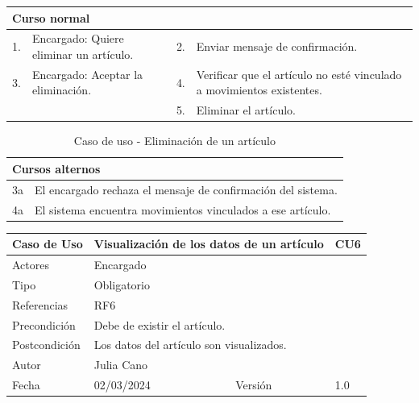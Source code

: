 \begin{table}[H]
	\centering
	\begin{tabular}{| m{} | m{} | m{} | m{} |}
		\hline
		\multicolumn{4}{|m{0.9\textwidth}|}{Curso normal}     \\ 
		\hline
		1. & Encargado: Quiere eliminar un artículo. & 2. &  Enviar mensaje de confirmación.  \\ 
		\hline
		3. & Encargado: Aceptar la eliminación. & 4. & Verificar que el artículo no esté vinculado a movimientos existentes. \\ 
		\hline
		 & & 5. & Eliminar el artículo. \\ 
		\hline
	\end{tabular}
\end{table}

\begin{table}[H]
	\centering
	\begin{tabular}{| m{} | m{} | m{} | m{} |}
		\hline
		\multicolumn{4}{|m{0.9\textwidth}|}{Cursos alternos}     \\ 
		\hline
		3a & \multicolumn{3}{m{0.67\textwidth}|}{El encargado rechaza el mensaje de confirmación del sistema.} \\ 
		\hline
		4a & \multicolumn{3}{m{0.67\textwidth}|}{El sistema encuentra movimientos vinculados a ese artículo.} \\ 
		\hline
	\end{tabular}
	\caption{Caso de uso - Eliminación de un artículo}
\end{table}

\newpage


\begin{table}[H]
	\centering
	\begin{tabular}{| m{} | m{} | m{} | m{} |}
		\hline
		\rowcolor{grayshade} Caso de Uso & \multicolumn{2}{|m{0.43\textwidth}|}{Visualización de los datos de un artículo} &  CU6\\ 
		\hline
		Actores & \multicolumn{3}{l|}{Encargado} \\ 
		\hline
		Tipo & \multicolumn{3}{l|}{Obligatorio} \\ 
		\hline
		Referencias & \multicolumn{3}{l|}{RF6} \\ 
		\hline
		Precondición & \multicolumn{3}{m{0.67\textwidth}|}{Debe de existir el artículo.} \\ 
		\hline
		Postcondición & \multicolumn{3}{l|}{Los datos del artículo son visualizados.} \\ 
		\hline
		Autor & \multicolumn{3}{l|}{Julia Cano} \\ 
		\hline
		Fecha & 02/03/2024 & Versión & 1.0 \\
		\hline
	\end{tabular}
\end{table}

